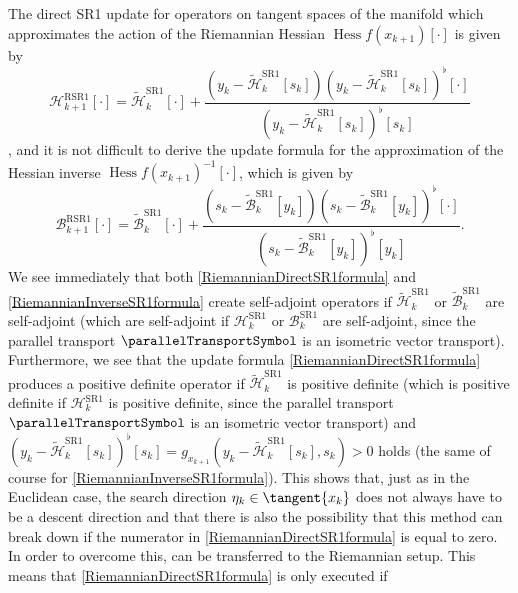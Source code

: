 The direct SR1 update for operators on tangent spaces of the manifold which approximates the action of the Riemannian Hessian $\operatorname{Hess} f(x_{k+1}) [\cdot]$ is given by 
\begin{equation}\label{RiemannianDirectSR1formula}
    \mathcal{H}^\mathrm{RSR1}_{k+1} [\cdot] = \widetilde{\mathcal{H}}^\mathrm{SR1}_k [\cdot] + \frac{(y_k - \widetilde{\mathcal{H}}^\mathrm{SR1}_k [s_k]) (y_k - \widetilde{\mathcal{H}}^\mathrm{SR1}_k [s_k])^{\flat} [\cdot] }{(y_k - \widetilde{\mathcal{H}}^\mathrm{SR1}_k [s_k])^{\flat} [s_k]}
\end{equation}
\cite[p.~18]{Huang:2013}, and it is not difficult to derive the update formula for the approximation of the Hessian inverse ${\operatorname{Hess} f(x_{k+1})}^{-1} [\cdot]$, which is given by 
\begin{equation}\label{RiemannianInverseSR1formula}
    \mathcal{B}^\mathrm{RSR1}_{k+1} [\cdot] = \widetilde{\mathcal{B}}^\mathrm{SR1}_k [\cdot] + \frac{(s_k - \widetilde{\mathcal{B}}^\mathrm{SR1}_k [y_k]) (s_k - \widetilde{\mathcal{B}}^\mathrm{SR1}_k [y_k])^{\flat} [\cdot] }{(s_k - \widetilde{\mathcal{B}}^\mathrm{SR1}_k [y_k])^{\flat} [y_k]}.
\end{equation}
We see immediately that both \cref{RiemannianDirectSR1formula} and \cref{RiemannianInverseSR1formula} create self-adjoint operators if $\widetilde{\mathcal{H}}^\mathrm{SR1}_k$ or $\widetilde{\mathcal{B}}^\mathrm{SR1}_k$ are self-adjoint (which are self-adjoint if $\mathcal{H}^\mathrm{SR1}_k$ or $\mathcal{B}^\mathrm{SR1}_k$ are self-adjoint, since the parallel transport $\parallelTransportSymbol$ is an isometric vector transport). Furthermore, we see that the update formula \cref{RiemannianDirectSR1formula} produces a positive definite operator if $\widetilde{\mathcal{H}}^\mathrm{SR1}_k$ is positive definite (which is positive definite if $\mathcal{H}^\mathrm{SR1}_k$ is positive definite, since the parallel transport $\parallelTransportSymbol$ is an isometric vector transport) and $(y_k - \widetilde{\mathcal{H}}^\mathrm{SR1}_k [s_k])^{\flat} [s_k] = g_{x_{k+1}}(y_k - \widetilde{\mathcal{H}}^\mathrm{SR1}_k [s_k], s_k) >0$ holds (the same of course for \cref{RiemannianInverseSR1formula}). This shows that, just as in the Euclidean case, the search direction $\eta_k \in \tangent{x_k}$ does not always have to be a descent direction and that there is also the possibility that this method can break down if the numerator in \cref{RiemannianDirectSR1formula} is equal to zero. In order to overcome this, can be transferred to the Riemannian setup. This means that \cref{RiemannianDirectSR1formula} is only executed if
